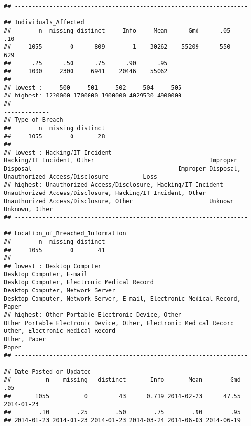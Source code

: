 \documentclass[
]{article}
\begin{document}
\begin{verbatim}
## --------------------------------------------------------------------------------
## Individuals_Affected 
##        n  missing distinct     Info     Mean      Gmd      .05      .10 
##     1055        0      809        1    30262    55209      550      629 
##      .25      .50      .75      .90      .95 
##     1000     2300     6941    20446    55062 
## 
## lowest :     500     501     502     504     505
## highest: 1220000 1700000 1900000 4029530 4900000
## --------------------------------------------------------------------------------
## Type_of_Breach 
##        n  missing distinct 
##     1055        0       28 
## 
## lowest : Hacking/IT Incident                                        Hacking/IT Incident, Other                                 Improper Disposal                                          Improper Disposal, Unauthorized Access/Disclosure          Loss                                                      
## highest: Unauthorized Access/Disclosure, Hacking/IT Incident        Unauthorized Access/Disclosure, Hacking/IT Incident, Other Unauthorized Access/Disclosure, Other                      Unknown                                                    Unknown, Other                                            
## --------------------------------------------------------------------------------
## Location_of_Breached_Information 
##        n  missing distinct 
##     1055        0       41 
## 
## lowest : Desktop Computer                                                           Desktop Computer, E-mail                                                   Desktop Computer, Electronic Medical Record                                Desktop Computer, Network Server                                           Desktop Computer, Network Server, E-mail, Electronic Medical Record, Paper
## highest: Other Portable Electronic Device, Other                                    Other Portable Electronic Device, Other, Electronic Medical Record         Other, Electronic Medical Record                                           Other, Paper                                                               Paper                                                                     
## --------------------------------------------------------------------------------
## Date_Posted_or_Updated 
##          n    missing   distinct       Info       Mean        Gmd        .05 
##       1055          0         43      0.719 2014-02-23      47.55 2014-01-23 
##        .10        .25        .50        .75        .90        .95 
## 2014-01-23 2014-01-23 2014-01-23 2014-03-24 2014-06-03 2014-06-19 

\end{verbatim}
\end{document}
